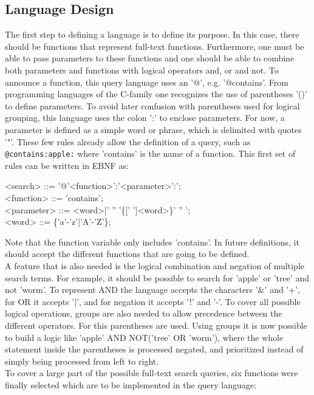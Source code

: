 \subsection{Language Design}
The first step to defining a language is to define its purpose. In this case, there should be functions that represent full-text functions. Furthermore, one must be able to pass parameters to these functions and one should be able to combine both parameters and functions with logical operators and, or and not.
To announce a function, this query language uses an '@', e.g. '@contains'. From programming languages of the C-family one recognizes the use of parentheses '()' to define parameters. To avoid later confusion with parentheses used for logical grouping, this language uses the colon ':' to enclose parameters. For now, a parameter is defined as a simple word or phrase, which is delimited with quotes '"'. These few rules already allow the definition of a query, such as \lstinline[language=Fulltext-Search]$@contains:apple:$ where 'contains' is the name of a function.
This first set of rules can be written in \ac{EBNF} as:
\begin{grammar}
    <search> ::= '@'<function>':'<parameter>':'; \\
    <function> ::= 'contains'; \\
    <parameter> ::= <word>|' '' '\{[' ']<word>\}' '' '; \\
    <word> ::= \{'a'-'z'|'A'-'Z'\};
\end{grammar}
Note that the function variable only includes 'contains'. In future definitions, it should accept the different functions that are going to be defined.\\
A feature that is also needed is the logical combination and negation of multiple search terms. For example, it should be possible to search for 'apple' or 'tree' and not 'worm'. To represent AND the language accepts the characters '\&' and '+', for OR it accepts '|', and for negation it accepts '!' and '-'. To cover all possible logical operations, groups are also needed to allow precedence between the different operators. For this parentheses are used. Using groups it is now possible to build a logic like 'apple' AND NOT('tree' OR 'worm'), where the whole statement inside the parentheses is processed negated, and prioritized instead of simply being processed from left to right.\\
To cover a large part of the possible full-text search queries, six functions were finally selected which are to be implemented in the query language:\\
